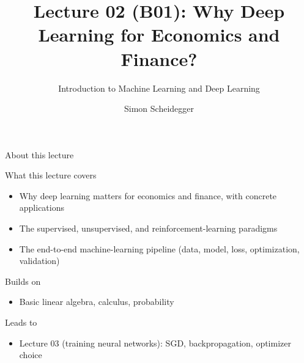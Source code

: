 \documentclass[aspectratio=169,11pt]{beamer}
\title[Lecture 02 (B01)]{Lecture 02 (B01): Why Deep Learning for Economics and Finance?}
\subtitle{Introduction to Machine Learning and Deep Learning}
\author{Simon Scheidegger}
\institute{HEC, University of Lausanne}
\date{}
\begin{document}
{
\begin{frame}
\titlepage
\end{frame}
}

\begin{frame}{About this lecture}
\small
\begin{block}{What this lecture covers}
\begin{itemize}\itemsep2pt
  \item Why deep learning matters for economics and finance, with concrete applications
  \item The supervised, unsupervised, and reinforcement-learning paradigms
  \item The end-to-end machine-learning pipeline (data, model, loss, optimization, validation)
\end{itemize}
\end{block}
\begin{block}{Builds on}
\begin{itemize}\itemsep2pt
  \item Basic linear algebra, calculus, probability
\end{itemize}
\end{block}
\begin{block}{Leads to}
\begin{itemize}\itemsep2pt
  \item Lecture 03 (training neural networks): SGD, backpropagation, optimizer choice
\end{itemize}
\end{block}
\end{frame}


{
\begin{frame}
\titlepage
\end{frame}
}
\end{document}
